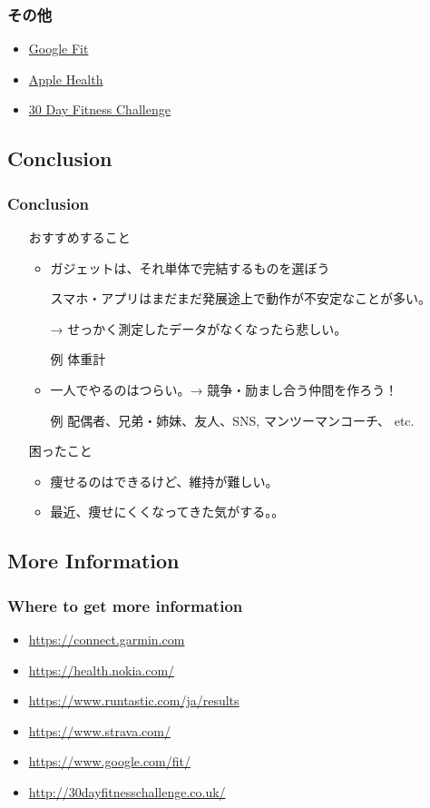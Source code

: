 \documentclass[aspectratio=169,11pt,hyperref={colorlinks=true}]{beamer}
\begin{document}
\begin{frame}
  \frametitle{その他}
  \begin{itemize}
    \item \href{https://www.google.com/fit/}{Google Fit}
    \item \href{https://www.apple.com/lae/ios/health/}{Apple Health}
    \item \href{http://30dayfitnesschallenge.co.uk/}{30 Day Fitness Challenge}
  \end{itemize}
\end{frame}

\subsection{Conclusion}
\begin{frame}
\frametitle{Conclusion}
  \begin{itemize}
  \item[] おすすめすること
    \begin{itemize}
    \item ガジェットは、それ単体で完結するものを選ぼう
    \item[] スマホ・アプリはまだまだ発展途上で動作が不安定なことが多い。
    \item[] → せっかく測定したデータがなくなったら悲しい。
    \item[例] 体重計
    \item 一人でやるのはつらい。→ 競争・励まし合う仲間を作ろう！
    \item[例] 配偶者、兄弟・姉妹、友人、SNS, マンツーマンコーチ、 etc.
    \end{itemize}
  \end{itemize}
  \begin{itemize}
  \item[] 困ったこと
    \begin{itemize}
      \item 痩せるのはできるけど、維持が難しい。
      \item 最近、痩せにくくなってきた気がする。。
    \end{itemize}
  \end{itemize}
\end{frame}

\subsection{More Information}
\begin{frame}
\frametitle{Where to get more information}
  \begin{itemize}
    \item \url{https://connect.garmin.com}
    \item \url{https://health.nokia.com/}
    \item \url{https://www.runtastic.com/ja/results}
    \item \url{https://www.strava.com/}
    \item \url{https://www.google.com/fit/}
    \item \url{http://30dayfitnesschallenge.co.uk/}
  \end{itemize}
\end{frame}
\end{document}
